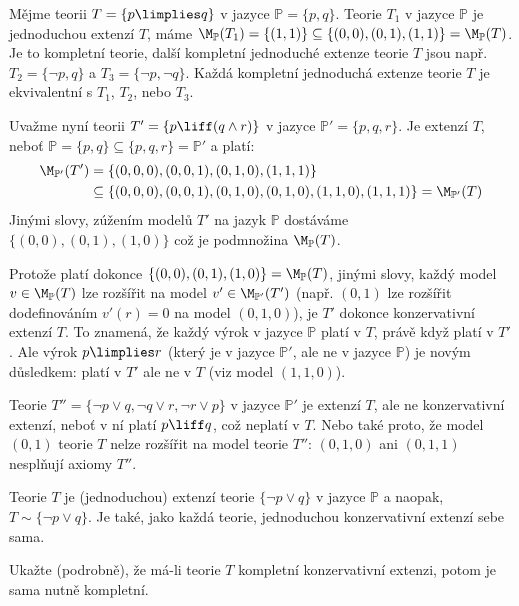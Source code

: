 \begin{example}
Mějme teorii $T=\{p\limplies q\}$ v jazyce $\mathbb P=\{p,q\}$. Teorie $T_1$ v jazyce $\mathbb P$ je jednoduchou extenzí $T$, máme $\M_\mathbb P(T_1)=\{(1,1)\}\subseteq\{(0,0),(0,1),(1,1)\}=\M_\mathbb P(T)$. Je to kompletní teorie, další kompletní jednoduché extenze teorie $T$ jsou např.\ $T_2=\{\neg p,q\}$ a $T_3=\{\neg p,\neg q\}$. Každá kompletní jednoduchá extenze teorie $T$ je ekvivalentní s $T_1$, $T_2$, nebo $T_3$.

Uvažme nyní teorii $T'=\{p\liff (q\land r)\}$ v jazyce $\mathbb P'=\{p,q,r\}$. Je extenzí $T$, neboť $\mathbb P=\{p,q\}\subseteq\{p,q,r\}=\mathbb P'$ a platí:
\begin{align*}
    \M_{\mathbb P'}(T')&=\{(0,0,0),(0,0,1),(0,1,0),(1,1,1)\}\\ 
    &\subseteq\{(0,0,0),(0,0,1),(0,1,0),(0,1,0),(1,1,0),(1,1,1)\}=\M_{\mathbb P'}(T)     
\end{align*}
Jinými slovy, zúžením modelů $T'$ na jazyk $\mathbb P$ dostáváme $\{(0,0),(0,1),(1,0)\}$ což je podmnožina $\M_\mathbb P(T)$. 

Protože platí dokonce $\{(0,0),(0,1),(1,0)\}=\M_\mathbb P(T)$, jinými slovy, každý model $v\in\M_\mathbb P(T)$ lze rozšířit na model $v'\in\M_{\mathbb P'}(T')$ (např. $(0,1)$ lze rozšířit dodefinováním $v'(r)=0$ na model $(0,1,0)$), je $T'$ dokonce konzervativní extenzí $T$. To znamená, že každý výrok v jazyce $\mathbb P$ platí v $T$, právě když platí v $T'$. Ale výrok $p\limplies r$ (který je v jazyce $\mathbb P'$, ale ne v jazyce $\mathbb P$) je novým důsledkem: platí v $T'$ ale ne v $T$ (viz model $(1,1,0)$).

Teorie $T''=\{\neg p\lor q,\neg q\lor r,\neg r\lor p\}$ v jazyce $\mathbb P'$ je extenzí $T$, ale ne konzervativní extenzí, neboť v ní platí $p\liff q$, což neplatí v $T$. Nebo také proto, že model $(0, 1)$ teorie $T$ nelze rozšířit na model teorie $T''$: $(0,1,0)$ ani $(0,1,1)$ nesplňují axiomy $T''$.

Teorie $T$ je (jednoduchou) extenzí teorie $\{\neg p\lor q\}$ v jazyce $\mathbb P$ a naopak, $T\sim\{\neg p\lor q\}$. Je také, jako každá teorie, jednoduchou konzervativní extenzí sebe sama.
\end{example}

\begin{exercise}
    Ukažte (podrobně), že má-li teorie $T$ kompletní konzervativní extenzi, potom je sama nutně kompletní.
\end{exercise}

